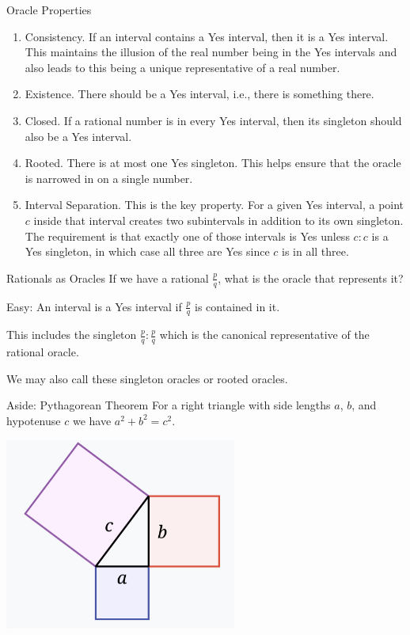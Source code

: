 \documentclass{beamer}
\begin{document}
\begin{frame}{Oracle Properties}

\begin{enumerate}
    \item Consistency. If an interval contains a Yes interval, then it is a Yes interval. This maintains the illusion of the real number being in the Yes intervals and also leads to this being a unique representative of a real number. 
    \item Existence. There should be a Yes interval, i.e., there is something there. 
    \item Closed. If a rational number is in every Yes interval, then its singleton should also be a Yes interval. 
    \item Rooted. There is at most one Yes singleton.  This helps ensure that the oracle is narrowed in on a single number. 
    \item Interval Separation. This is the key property. For a given Yes interval, a point $c$ inside that interval creates two subintervals in addition to its own singleton. The requirement is that exactly one of those intervals is Yes unless $c:c$ is a Yes singleton, in which case all three are Yes since $c$ is in all three.  
\end{enumerate}

\end{frame}

\begin{frame}{Rationals as Oracles}
    If we have a rational $\frac{p}{q}$, what is the oracle that represents it? 

    Easy: An interval is a Yes interval if $\frac{p}{q}$ is contained in it. 

    This includes the singleton $\frac{p}{q}:\frac{p}{q}$ which is the canonical representative of the rational oracle. 

    We may also call these singleton oracles or rooted oracles. 
\end{frame}

\begin{frame}{Aside: Pythagorean Theorem}
    For a right triangle with side lengths $a$, $b$, and hypotenuse $c$ we have $a^2 + b^2 = c^2$.

    \includegraphics[width=3in]{Images/pythagoras.png}

\end{frame}
\end{document}

